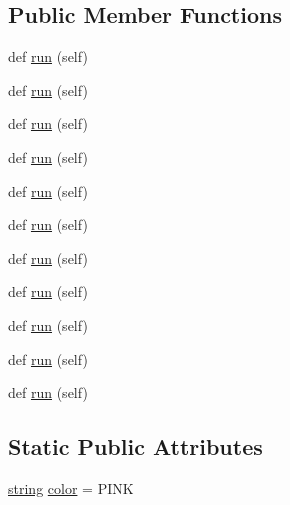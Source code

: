 \subsection*{Public Member Functions}
\begin{DoxyCompactItemize}
\item 
def \hyperlink{classwaflib_1_1_tools_1_1c__tests_1_1grep__for__endianness_a81afcbe7adfc10254bfd377a958abc56}{run} (self)
\item 
def \hyperlink{classwaflib_1_1_tools_1_1c__tests_1_1grep__for__endianness_a81afcbe7adfc10254bfd377a958abc56}{run} (self)
\item 
def \hyperlink{classwaflib_1_1_tools_1_1c__tests_1_1grep__for__endianness_a81afcbe7adfc10254bfd377a958abc56}{run} (self)
\item 
def \hyperlink{classwaflib_1_1_tools_1_1c__tests_1_1grep__for__endianness_a81afcbe7adfc10254bfd377a958abc56}{run} (self)
\item 
def \hyperlink{classwaflib_1_1_tools_1_1c__tests_1_1grep__for__endianness_a81afcbe7adfc10254bfd377a958abc56}{run} (self)
\item 
def \hyperlink{classwaflib_1_1_tools_1_1c__tests_1_1grep__for__endianness_a81afcbe7adfc10254bfd377a958abc56}{run} (self)
\item 
def \hyperlink{classwaflib_1_1_tools_1_1c__tests_1_1grep__for__endianness_a81afcbe7adfc10254bfd377a958abc56}{run} (self)
\item 
def \hyperlink{classwaflib_1_1_tools_1_1c__tests_1_1grep__for__endianness_a81afcbe7adfc10254bfd377a958abc56}{run} (self)
\item 
def \hyperlink{classwaflib_1_1_tools_1_1c__tests_1_1grep__for__endianness_a81afcbe7adfc10254bfd377a958abc56}{run} (self)
\item 
def \hyperlink{classwaflib_1_1_tools_1_1c__tests_1_1grep__for__endianness_a81afcbe7adfc10254bfd377a958abc56}{run} (self)
\item 
def \hyperlink{classwaflib_1_1_tools_1_1c__tests_1_1grep__for__endianness_a81afcbe7adfc10254bfd377a958abc56}{run} (self)
\end{DoxyCompactItemize}
\subsection*{Static Public Attributes}
\begin{DoxyCompactItemize}
\item 
\hyperlink{test__lib_f_l_a_c_2format_8c_ab02026ad0de9fb6c1b4233deb0a00c75}{string} \hyperlink{classwaflib_1_1_tools_1_1c__tests_1_1grep__for__endianness_acff41c43e9c864074fc3a14c21d83090}{color} = \textquotesingle{}P\+I\+NK\textquotesingle{}
\end{DoxyCompactItemize}
